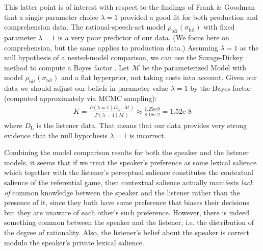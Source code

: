 This latter point is of interest with respect to the findings of Frank
\& Goodman that a single parameter choice $\lambda=1$ provided a good
fit for both production and comprehension data. The
rational-speech-act model
$\rho_{\mathrm{b}\mathcal{U}}(\sigma_{\mathrm{b}\mathcal{S}})$ with
fixed parameter $\lambda=1$ is a very poor predictor of our data. (We
focus here on comprehension, but the same applies to production data.)
Assuming $\lambda =1$ as the null hypothesis of a nested-model
comparison, we can use the Savage-Dickey method to compute a Bayes
factor
\cite{DickeyLientz1970:The-Weighted-Li,WagenmakersLodewyckx2010:Bayesian-hypoth}. Let
$\mathcal{M}$ be the parameterized Model with model
$\rho_{\mathrm{b}\mathcal{U}}(\sigma_{\mathrm{b}\mathcal{S}})$ and a
flat hyperprior, not taking costs into account. Given our data we
should adjust our beliefs in parameter value $\lambda=1$ by the Bayes
factor (computed approximately via MCMC sampling):
\begin{align*}
  K = \frac{P(\lambda=1 \mid D_\mathrm{L} \, , \, \mathcal{M})}{P(\lambda=1
    \mid \mathcal{M})} \approx \frac{1.25\text{e-9}}{8.18\text{e-2}} =
  1.52\text{e-8} 
\end{align*}
where $D_\mathrm{L}$ is the listener data. That means that our data
provides very strong evidence that the null hypothesis $\lambda=1$ is
incorrect.

\bigskip

Combining the model comparison results for both the speaker and the
listener models, it seems that if we treat the speaker's preference as
some lexical salience which together with the listener's perceptual
salience constitutes the contextual salience of the referential game,
then contextual salience actually manifests \emph{lack of} common
knowledge between the speaker and the listener rather than the
presence of it, since they both have some preference that biases their
decisions but they are unaware of each other's such
preference. However, there is indeed something common between the
speaker and the listener, i.e. the distribution of the degree of
rationality. Also, the listener's belief about the speaker is correct
modulo the speaker's private lexical salience.


